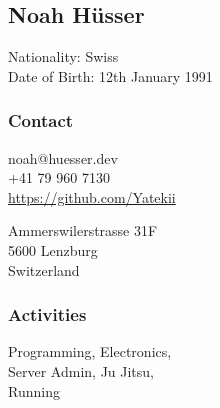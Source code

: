 \begin{facts}
    \sectionsep
    \section{Noah Hüsser}
    Nationality: Swiss\\
    Date of Birth: 12th January 1991
    \sectionsep
    
    \subsubsection{Contact}
    noah@huesser.dev\\
    +41 79 960 7130\\
    \href{https://github.com/Yatekii}{https://github.com/Yatekii}\par
    \vspace{\baselineskip}
    Ammerswilerstrasse 31F\\
    5600 Lenzburg\\
    Switzerland
    \sectionsep
    
    \subsubsection{Activities}
    Programming, Electronics,\\
    Server Admin, Ju Jitsu, \\
    Running
    \sectionsep
    

\end{facts}
